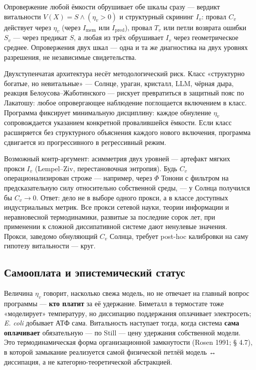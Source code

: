 \documentclass[pdflatex,sn-mathphys-ay]{sn-jnl}
\begin{document}
Опровержение любой ёмкости обрушивает обе шкалы сразу --- вердикт витальности \(V(X) = S \wedge (\eta_v > 0)\) и структурный скрининг \(I_v\): провал \(C_v\) действует через \(\eta_v\) (через \(I_{\text{mem}}\) или \(I_{\text{pred}}\)), провал \(T_v\) или петли возврата ошибки \(S_v\) --- через предикат \(S\), а любая из трёх обрушивает \(I_v\) через геометрическое среднее. Опровержения двух шкал --- одна и та же диагностика на двух уровнях разрешения, не независимые свидетельства.

Двухступенчатая архитектура несёт методологический риск. Класс «структурно богатые, но невитальные» --- Солнце, ураган, кристалл, LLM, чёрная дыра, реакция Белоусова--Жаботинского --- рискует превратиться в защитный пояс по Лакатошу: любое опровергающее наблюдение поглощается включением в класс. Программа фиксирует минимальную дисциплину: каждое обнуление \(\eta_v\) сопровождается указанием конкретной провалившейся ёмкости. Если класс расширяется без структурного объяснения каждого нового включения, программа сдвигается из прогрессивного в регрессивный режим.

Возможный контр-аргумент: асимметрия двух уровней --- артефакт мягких прокси \(I_v\) (Lempel--Ziv, перестановочная энтропия). Будь \(C_v\) операционализирован строже --- например, через \(\Phi\) Тонони с фильтром на предсказательную силу относительно собственной среды, --- у Солнца получился бы \(C_v \to 0\). Ответ: дело не в выборе одного прокси, а в классе доступных индустриальных метрик. Все прокси сетевой науки, теории информации и неравновесной термодинамики, развитые за последние сорок лет, при применении к сложной диссипативной системе дают ненулевые значения. Прокси, заведомо обнуляющий \(C_v\) Солнца, требует post-hoc калибровки на саму гипотезу витальности --- круг.

\subsection{Самооплата и эпистемический статус}\label{ux441ux430ux43cux43eux43eux43fux43bux430ux442ux430-ux438-ux44dux43fux438ux441ux442ux435ux43cux438ux447ux435ux441ux43aux438ux439-ux441ux442ux430ux442ux443ux441}

Величина \(\eta_v\) говорит, насколько свежа модель, но не отвечает на главный вопрос программы --- \textbf{кто платит} за её удержание. Биметалл в термостате тоже «моделирует» температуру, но диссипацию поддержания оплачивает электросеть; \emph{E. coli} добывает АТФ сама. Витальность наступает тогда, когда система \textbf{сама оплачивает} обязательную --- по Still --- цену удержания собственной модели. Это термодинамическая форма организационной замкнутости (Rosen 1991; § 4.7), в которой замыкание реализуется самой физической петлёй модель ↔ диссипация, а не категорно-теоретической абстракцией.
\end{document}
